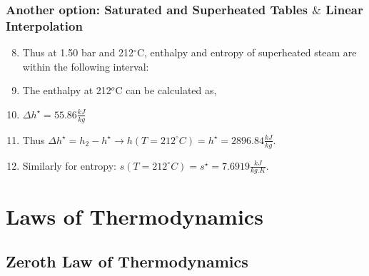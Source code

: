 \documentclass[10pt,compress,handout,ignorenonframetext]{beamer}
\begin{document}
\begin{frame}
  \frametitle{Another option: Saturated and Superheated Tables $\&$ Linear Interpolation}
\noindent
\begin{enumerate}\setcounter{enumi}{7}\scriptsize
\item <1-> Thus at 1.50 bar and 212$^{\circ}$C, enthalpy and entropy of superheated steam are within the following interval:
\item<2-> The enthalpy at 212$^{o}$C can be calculated as,
\item <4-> $\Delta h^{\star}=55.86\frac{kJ}{kg}$ 
\item <4-> Thus $\Delta h^{\star}= h_{2}-h^{\star} \longrightarrow h\left(T=212^{\circ}C\right)=h^{\star}=2896.84\frac{kJ}{kg}$.
\item<5-> Similarly for entropy: $s\left(T=212^{\circ}C\right)=s^{\star}=7.6919\frac{kJ}{kg.K}$.
\end{enumerate}

\end{frame}



\section{Laws of Thermodynamics}


\subsection{Zeroth Law of Thermodynamics}
\end{document}
